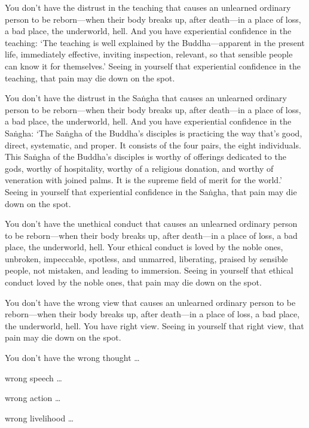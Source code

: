 \documentclass[12pt,openany]{book}%
\begin{document}
You don’t have the distrust in the teaching that causes an unlearned ordinary person to be reborn—when their body breaks up, after death—in a place of loss, a bad place, the underworld, hell. And you have experiential confidence in the teaching: ‘The teaching is well explained by the Buddha—apparent in the present life, immediately effective, inviting inspection, relevant, so that sensible people can know it for themselves.’ Seeing in yourself that experiential confidence in the teaching, that pain may die down on the spot. 

You don’t have the distrust in the \textsanskrit{Saṅgha} that causes an unlearned ordinary person to be reborn—when their body breaks up, after death—in a place of loss, a bad place, the underworld, hell. And you have experiential confidence in the \textsanskrit{Saṅgha}: ‘The \textsanskrit{Saṅgha} of the Buddha’s disciples is practicing the way that’s good, direct, systematic, and proper. It consists of the four pairs, the eight individuals. This \textsanskrit{Saṅgha} of the Buddha’s disciples is worthy of offerings dedicated to the gods, worthy of hospitality, worthy of a religious donation, and worthy of veneration with joined palms. It is the supreme field of merit for the world.’ Seeing in yourself that experiential confidence in the \textsanskrit{Saṅgha}, that pain may die down on the spot. 

You don’t have the unethical conduct that causes an unlearned ordinary person to be reborn—when their body breaks up, after death—in a place of loss, a bad place, the underworld, hell. Your ethical conduct is loved by the noble ones, unbroken, impeccable, spotless, and unmarred, liberating, praised by sensible people, not mistaken, and leading to immersion. Seeing in yourself that ethical conduct loved by the noble ones, that pain may die down on the spot. 

You don’t have the wrong view that causes an unlearned ordinary person to be reborn—when their body breaks up, after death—in a place of loss, a bad place, the underworld, hell. You have right view. Seeing in yourself that right view, that pain may die down on the spot. 

You don’t have the wrong thought … 

wrong speech … 

wrong action … 

wrong livelihood … 
\end{document}
